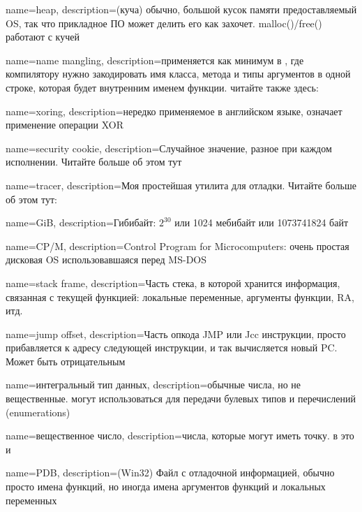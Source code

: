 {
  name=heap,
  description={(куча) обычно, большой кусок памяти предоставляемый \ac{OS}, так что прикладное ПО может делить его
  как захочет. malloc()/free() работают с кучей}
}

{
  name=name mangling,
  description={применяется как минимум в \Cpp, где компилятору нужно закодировать имя класса,
  метода и типы аргументов в одной
  строке, которая будет внутренним именем функции. читайте также здесь: }
}

{
  name=xoring,
  description={нередко применяемое в английском языке, означает применение операции 
  \ac{XOR}}
}

{
  name=security cookie,
  description={Случайное значение, разное при каждом исполнении. Читайте больше об этом тут}
}

{
  name=tracer,
  description={Моя простейшая утилита для отладки. Читайте больше об этом тут: }
}

{
  name=GiB,
  description={Гибибайт: $2^{30}$ или 1024 мебибайт или 1073741824 байт}
}

{
  name=CP/M,
  description={Control Program for Microcomputers: очень простая дисковая \ac{OS} использовавшаяся перед MS-DOS}
}

{
  name=stack frame,
  description={Часть стека, в которой хранится информация, связанная с текущей функцией: локальные переменные,
  аргументы функции, \ac{RA}, итд.}
}

{
  name=jump offset,
  description={Часть опкода JMP или Jcc инструкции, просто прибавляется к адресу следующей инструкции,
  и так вычисляется новый \ac{PC}. Может быть отрицательным}
}

{
  name=интегральный тип данных,
  description={обычные числа, но не вещественные. могут использоваться для передачи булевых типов и перечислений (enumerations)}
}

{
  name=вещественное число,
  description={числа, которые могут иметь точку. в \CCpp это \Tfloat и \Tdouble}
}

{
  name=PDB,
  description={(Win32) Файл с отладочной информацией, обычно просто имена функций, 
  но иногда имена аргументов функций и локальных переменных}
}

